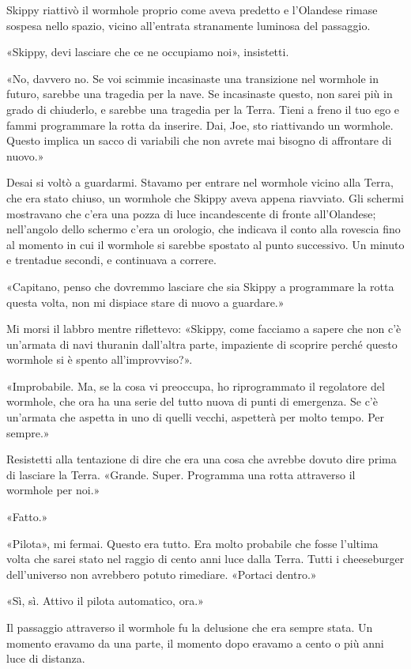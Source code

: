 Skippy riattivò il wormhole proprio come aveva predetto e l'Olandese
rimase sospesa nello spazio, vicino all'entrata stranamente luminosa del
passaggio.

«Skippy, devi lasciare che ce ne occupiamo noi», insistetti.

«No, davvero no. Se voi scimmie incasinaste una transizione nel wormhole
in futuro, sarebbe una tragedia per la nave. Se incasinaste questo, non
sarei più in grado di chiuderlo, e sarebbe una tragedia per la Terra.
Tieni a freno il tuo ego e fammi programmare la rotta da inserire. Dai,
Joe, sto riattivando un wormhole. Questo implica un sacco di variabili
che non avrete mai bisogno di affrontare di nuovo.»

Desai si voltò a guardarmi. Stavamo per entrare nel wormhole vicino alla
Terra, che era stato chiuso, un wormhole che Skippy aveva appena
riavviato. Gli schermi mostravano che c'era una pozza di luce
incandescente di fronte all'Olandese; nell'angolo dello schermo c'era un
orologio, che indicava il conto alla rovescia fino al momento in cui il
wormhole si sarebbe spostato al punto successivo. Un minuto e trentadue
secondi, e continuava a correre.

«Capitano, penso che dovremmo lasciare che sia Skippy a programmare la
rotta questa volta, non mi dispiace stare di nuovo a guardare.»

Mi morsi il labbro mentre riflettevo: «Skippy, come facciamo a sapere
che non c'è un'armata di navi thuranin dall'altra parte, impaziente di
scoprire perché questo wormhole si è spento all'improvviso?».

«Improbabile. Ma, se la cosa vi preoccupa, ho riprogrammato il
regolatore del wormhole, che ora ha una serie del tutto nuova di punti
di emergenza. Se c'è un'armata che aspetta in uno di quelli vecchi,
aspetterà per molto tempo. Per sempre.»

Resistetti alla tentazione di dire che era una cosa che avrebbe dovuto
dire prima di lasciare la Terra. «Grande. Super. Programma una rotta
attraverso il wormhole per noi.»

«Fatto.»

«Pilota», mi fermai. Questo era tutto. Era molto probabile che fosse
l'ultima volta che sarei stato nel raggio di cento anni luce dalla
Terra. Tutti i cheeseburger dell'universo non avrebbero potuto
rimediare. «Portaci dentro.»

«Sì, sì. Attivo il pilota automatico, ora.»

Il passaggio attraverso il wormhole fu la delusione che era sempre
stata. Un momento eravamo da una parte, il momento dopo eravamo a cento
o più anni luce di distanza.

